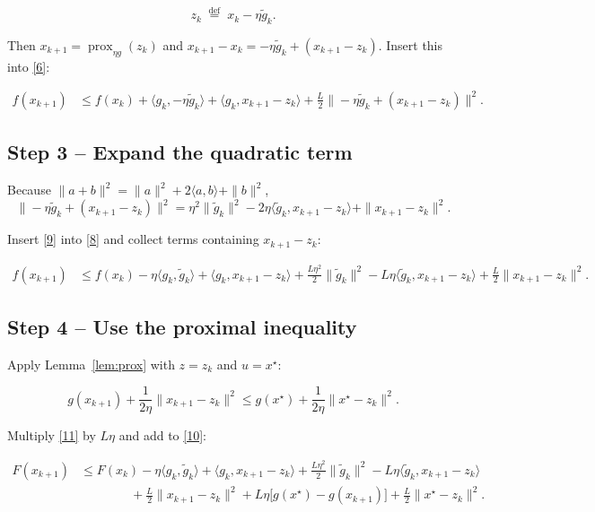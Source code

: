 \documentclass[11pt]{article}
\begin{document}
\[
z_{k}\;\stackrel{\mathrm{def}}{=}\;x_{k}-\eta\tilde g_{k}.
\tag{7}
\]

Then $x_{k+1}= \operatorname{prox}_{\eta g}(z_{k})$ and $x_{k+1}-x_{k}= -\eta\tilde g_{k}+ (x_{k+1}-z_{k})$.
Insert this into \eqref{6}:

\[
\begin{aligned}
f(x_{k+1})
&\le f(x_{k})
+\langle g_{k},-\eta\tilde g_{k}\rangle
+\langle g_{k},x_{k+1}-z_{k}\rangle
+\frac{L}{2}\|-\eta\tilde g_{k}+ (x_{k+1}-z_{k})\|^{2}.
\end{aligned}
\tag{8}
\]

\subsection*{Step 3 – Expand the quadratic term}
Because $\|a+b\|^{2}= \|a\|^{2}+2\langle a,b\rangle+\|b\|^{2}$,
\[
\|-\eta\tilde g_{k}+ (x_{k+1}-z_{k})\|^{2}
=\eta^{2}\|\tilde g_{k}\|^{2}
-2\eta\langle\tilde g_{k},x_{k+1}-z_{k}\rangle
+\|x_{k+1}-z_{k}\|^{2}.
\tag{9}
\]

Insert \eqref{9} into \eqref{8} and collect terms containing $x_{k+1}-z_{k}$:

\[
\begin{aligned}
f(x_{k+1})
&\le f(x_{k})
-\eta\langle g_{k},\tilde g_{k}\rangle
+\langle g_{k},x_{k+1}-z_{k}\rangle
+\frac{L\eta^{2}}{2}\|\tilde g_{k}\|^{2}
-L\eta\langle\tilde g_{k},x_{k+1}-z_{k}\rangle
+\frac{L}{2}\|x_{k+1}-z_{k}\|^{2}.
\end{aligned}
\tag{10}
\]

\subsection*{Step 4 – Use the proximal inequality}
Apply Lemma~\ref{lem:prox} with $z=z_{k}$ and $u=x^{\star}$:

\[
g(x_{k+1})+\frac{1}{2\eta}\|x_{k+1}-z_{k}\|^{2}
\le
g(x^{\star})+\frac{1}{2\eta}\|x^{\star}-z_{k}\|^{2}.
\tag{11}
\]

Multiply \eqref{11} by $L\eta$ and add to \eqref{10}:

\[
\begin{aligned}
F(x_{k+1})
&\le F(x_{k})
-\eta\langle g_{k},\tilde g_{k}\rangle
+\langle g_{k},x_{k+1}-z_{k}\rangle
+\frac{L\eta^{2}}{2}\|\tilde g_{k}\|^{2}
-L\eta\langle\tilde g_{k},x_{k+1}-z_{k}\rangle\\
&\qquad\qquad
+\frac{L}{2}\|x_{k+1}-z_{k}\|^{2}
+L\eta\bigl[g(x^{\star})-g(x_{k+1})\bigr]
+\frac{L}{2}\|x^{\star}-z_{k}\|^{2}.
\end{aligned}
\tag{12}
\]
\end{document}
